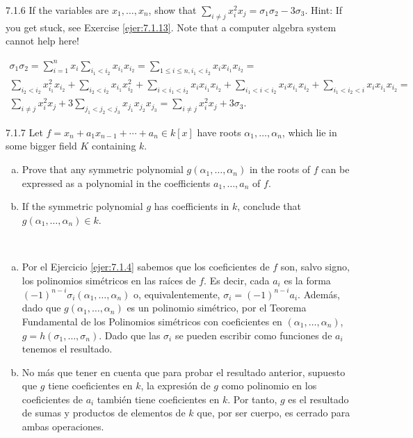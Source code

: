 \documentclass[twoside]{article}
\begin{document}
\begin{ejercicio}{7.1.6}
If the variables are $x_1, \dots , x_n$, show that $\sum_{i\neq j} x^2_i
x_j = σ_1σ_2 −3σ_3$. Hint: If you get stuck,
see Exercise \ref{ejer:7.1.13}. Note that a computer algebra system cannot help here!
\end{ejercicio}
\begin{solucion}
\begin{gather*}
\sigma_1\sigma_2=\sum_{i=1}^nx_i\sum_{i_1<i_2}x_{i_1}x_{i_2}=\sum_{1\leq i\leq n, i_1<i_2}x_ix_{i_1}x_{i_2}=\\
\sum_{i_2<i_2}x_{i_1}^2x_{i_2}+\sum_{i_2<i_2}x_{i_1}x_{i_2}^2+\sum_{i<i_1<i_2}x_ix_{i_1}x_{i_2}+\sum_{i_1<i<i_2}x_ix_{i_1}x_{i_2}+\sum_{i_1<i_2<i}x_ix_{i_1}x_{i_2}=\\
\sum_{i\neq j} x_i^2x_j+3\sum_{j_1<j_2<j_3}x_{j_1}x_{j_2}x_{j_3}=\sum_{i\neq j} x_i^2x_j+3\sigma_3.
\end{gather*}
\end{solucion}
\newpage

\begin{ejercicio}{7.1.7}
Let $f = x_n + a_1x_{n−1} + \cdots + a_n ∈ k[x]$ have roots $α_1,\dots, α_n$, which lie in some bigger
field $K$ containing $k$.
\begin{enumerate}[a.]
\item Prove that any symmetric polynomial $g(α_1, \dots , α_n)$ in the roots of $f$ can be expressed
as a polynomial in the coefficients $a_1, \dots , a_n$ of $f$.
\item If the symmetric polynomial $g$ has coefficients in $k$, conclude that
$g(α_1, \dots , α_n) ∈ k$.
\end{enumerate}
 
\end{ejercicio}
\begin{solucion}\
\begin{enumerate}[a.]
\item Por el Ejercicio \ref{ejer:7.1.4} sabemos que los coeficientes de $f$ son, salvo signo, los polinomios simétricos en las raíces de $f$. Es decir, cada $a_i$ es la forma $(-1)^{n-i}\sigma_i(\alpha_1,\dotsc,\alpha_n)$ o, equivalentemente, $\sigma_i = (-1)^{n-i}a_i$. Además, dado que $g(\alpha_1,\dotsc,\alpha_n)$ es un polinomio simétrico, por el Teorema Fundamental de los Polinomios simétricos con coeficientes en $(\alpha_1,\dotsc,\alpha_n)$, $g=h(\sigma_1,\dotsc,\sigma_n)$. Dado que las $\sigma_i$ se pueden escribir como funciones de $a_i$ tenemos el resultado.
\item No más que tener en cuenta que para probar el resultado anterior, supuesto que $g$ tiene coeficientes en $k$, la expresión de $g$ como polinomio en los coeficientes de $a_i$ también tiene coeficientes en $k$. Por tanto, $g$ es el resultado de sumas y productos de elementos de $k$ que, por ser cuerpo, es cerrado para ambas operaciones.
\end{enumerate}

\end{solucion}
\end{document}
